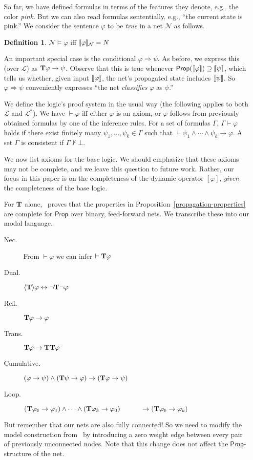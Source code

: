\documentclass[letterpaper]{article}
\theoremstyle{definition}
\newtheorem{definition}{Definition}
\newcommand{\semantics}[1]{[\![\mbox{\em $ #1 $\/}]\!]}
\newcommand{\lang}{\mathcal{L}}
\newcommand{\uplang}{\mathcal{L}^\ast}
\newcommand{\proves}{\vdash}
\newcommand{\Net}{\mathcal{N}}
\newcommand{\Prop}{\mathsf{Prop}}
\newcommand{\Typ}[1]{\textrm{\textup{\textbf{T}}} #1}
\newcommand{\TypNoArgs}{\textrm{\textup{\textbf{T}}}}
\newcommand{\Hebbop}[1]{[#1]}
\newcommand{\diaTyp}[1]{\langle \textrm{\textup{\textbf{T}}} \rangle #1}
\begin{document}
So far, we have defined formulas in terms of the features they denote, e.g., the color \emph{pink}.  But we can also read formulas sententially, e.g., ``the current state is pink.''  We consider the sentence $\varphi$ to be \emph{true} in a net $\Net$ as follows.
\begin{definition}
    $\Net \models \varphi$ iff $\semantics{\varphi}_\Net = N$
\end{definition}
An important special case is the conditional $\varphi \Rightarrow \psi$.  As before, we express this (over $\lang$) as $\Typ{\varphi} \to \psi$.  Observe that this is true whenever $\Prop(\semantics{\varphi}) \supseteq \semantics{\psi}$, which tells us whether, given input $\semantics{\varphi}$, the net's propagated state includes $\semantics{\psi}$.  So $\varphi \Rightarrow \psi$ conveniently expresses ``the net \emph{classifies} $\varphi$ as $\psi$.''

We define the logic's proof system in the usual way (the following applies to both $\lang$ and $\uplang$).  We have $\proves \varphi$ iff either $\varphi$ is an axiom, or $\varphi$ follows from previously obtained formulas by one of the inference rules.  For a set of formulas $\Gamma$, $\Gamma \proves \varphi$ holds if there exist finitely many $\psi_1, \ldots, \psi_k \in \Gamma$ such that $\proves \psi_1 \land \cdots \land \psi_k \to \varphi$.  A set $\Gamma$ is consistent if $\Gamma \not \proves \bot$.

We now list axioms for the base logic.  We should emphasize that these axioms may not be complete, and we leave this question to future work.  Rather, our focus in this paper is on the completeness of the dynamic operator $\Hebbop{\varphi}$, \emph{given} the completeness of the base logic.

For $\TypNoArgs$ alone,~\cite{leitgeb2001nonmonotonic} proves that the properties in Proposition~\ref{propagation-properties} are complete for $\Prop$ over binary, feed-forward nets.  We transcribe these into our modal language.
\begin{description}
    \item[Nec.] From $\proves \varphi$ we can infer $\proves \Typ{\varphi}$
    \item[Dual.] $\diaTyp{\varphi} \leftrightarrow \neg \Typ{\neg \varphi}$
    \item[Refl.] $\Typ{\varphi} \to \varphi$
    \item[Trans.] $\Typ{\varphi} \to \Typ{\Typ{\varphi}}$
    \item[Cumulative.] $(\varphi \to \psi) \land (\Typ{\psi} \to \varphi) \to (\Typ{\varphi} \to \psi)$
    \item[Loop.] $(\Typ \varphi_0 \to \varphi_1) \land \cdots \land (\Typ \varphi_k \to \varphi_0)\\ 
    \hspace*{3em} \to (\Typ \varphi_0 \to \varphi_k)$
\end{description}
But remember that our nets are also fully connected!  So we need to modify the model construction from~\cite{leitgeb2001nonmonotonic} by introducing a zero weight edge between every pair of previously unconnected nodes.  Note that this change does not affect the $\Prop$-structure of the net.
\end{document}
